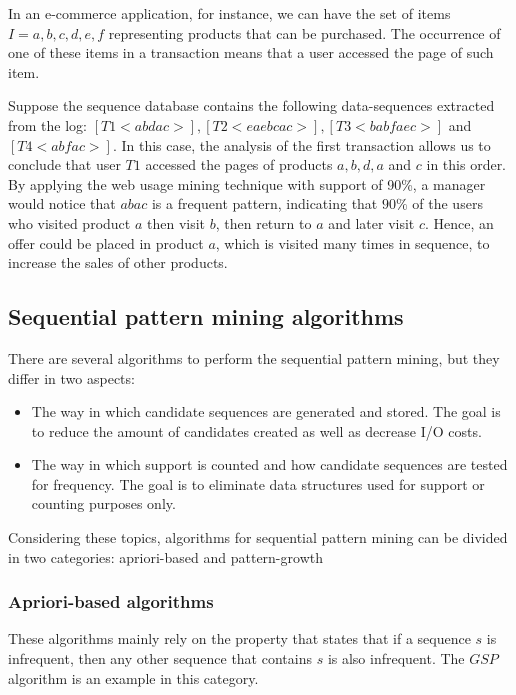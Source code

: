 In an e-commerce application, for instance, we can have the set of items $I = {a, b, c, d, e, f}$ representing products that can be purchased. The occurrence of one of these items in a transaction means that a user accessed the page of such item.

Suppose the sequence database contains the following data-sequences extracted from the log: $[T1 <abdac>], [T2 <eaebcac>], [T3 <babfaec>]$ and $[T4 <abfac>]$. In this case, the analysis of the first transaction allows us to conclude that user $T1$ accessed the pages of products $a,b,d,a$ and $c$ in this order. By applying the web usage mining technique with support of 90\%, a manager would notice that $abac$ is a frequent pattern, indicating that $90\%$ of the users who visited product $a$ then visit $b$, then return to $a$ and later visit $c$. Hence, an offer could be placed in product $a$, which is visited many times in sequence, to increase the sales of other products. 


\subsection{Sequential pattern mining algorithms}

There are several algorithms to perform the sequential pattern mining, but they differ in two aspects\cite{Nizar}:

\begin{itemize}

\item The way in which candidate sequences are generated and stored. The goal is to reduce the amount of candidates created as well as decrease I/O costs.

\item The way in which support is counted and how candidate sequences are tested for frequency. The goal is to eliminate data structures used for support or counting purposes only.

\end{itemize}

Considering these topics, algorithms for sequential pattern mining can be divided in two categories: apriori-based and pattern-growth

\subsubsection{Apriori-based algorithms}

These algorithms mainly rely on the property that states that if a sequence $s$ is infrequent, then any other sequence that contains $s$ is also infrequent. The $GSP$\cite{Rakesh} algorithm is an example in this category.


